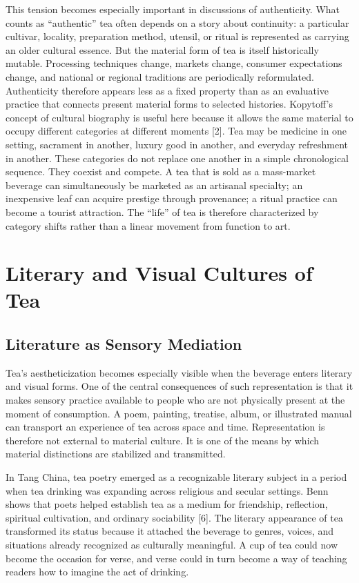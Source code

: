 \documentclass[11pt,a4paper]{article}
\begin{document}
This tension becomes especially important in discussions of authenticity. What counts as ``authentic'' tea often depends on a story about continuity: a particular cultivar, locality, preparation method, utensil, or ritual is represented as carrying an older cultural essence. But the material form of tea is itself historically mutable. Processing techniques change, markets change, consumer expectations change, and national or regional traditions are periodically reformulated. Authenticity therefore appears less as a fixed property than as an evaluative practice that connects present material forms to selected histories. Kopytoff's concept of cultural biography is useful here because it allows the same material to occupy different categories at different moments [2]. Tea may be medicine in one setting, sacrament in another, luxury good in another, and everyday refreshment in another. These categories do not replace one another in a simple chronological sequence. They coexist and compete. A tea that is sold as a mass-market beverage can simultaneously be marketed as an artisanal specialty; an inexpensive leaf can acquire prestige through provenance; a ritual practice can become a tourist attraction. The ``life'' of tea is therefore characterized by category shifts rather than a linear movement from function to art.

\section{Literary and Visual Cultures of Tea}

\subsection{Literature as Sensory Mediation}

Tea's aestheticization becomes especially visible when the beverage enters literary and visual forms. One of the central consequences of such representation is that it makes sensory practice available to people who are not physically present at the moment of consumption. A poem, painting, treatise, album, or illustrated manual can transport an experience of tea across space and time. Representation is therefore not external to material culture. It is one of the means by which material distinctions are stabilized and transmitted.

In Tang China, tea poetry emerged as a recognizable literary subject in a period when tea drinking was expanding across religious and secular settings. Benn shows that poets helped establish tea as a medium for friendship, reflection, spiritual cultivation, and ordinary sociability [6]. The literary appearance of tea transformed its status because it attached the beverage to genres, voices, and situations already recognized as culturally meaningful. A cup of tea could now become the occasion for verse, and verse could in turn become a way of teaching readers how to imagine the act of drinking.
\end{document}
